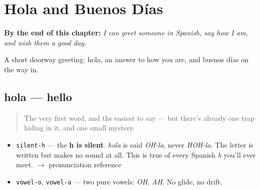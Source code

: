 
\chapter{Hola and Buenos Días}
\label{ch:first-words}

\begin{chapteropening}
\textbf{By the end of this chapter:} \emph{I can greet someone in Spanish, say how I am, and wish them a good day.}

A short doorway greeting: hola, an answer to how you are, and buenos días on the way in.
\end{chapteropening}

\section[hola]{hola — hello}

\label{lesson:ES-C01-hola}



\begin{quote}
The very first word, and the easiest to say — but there's already one trap hiding in it, and one small mystery.
\end{quote}

\begin{sounds}
\begin{itemize}
\raggedright
  \item \texttt{silent-h} — the \textbf{h is silent}. \emph{hola} is said \emph{OH-la}, never \emph{HOH-la}. The letter is written but makes no sound at all. This is true of every Spanish \emph{h} you'll ever meet. $\to$ pronunciation reference
  \item \texttt{vowel-o}, \texttt{vowel-a} — two pure vowels: \emph{OH}, \emph{AH}. No glide, no drift.
\end{itemize}
\end{sounds}


